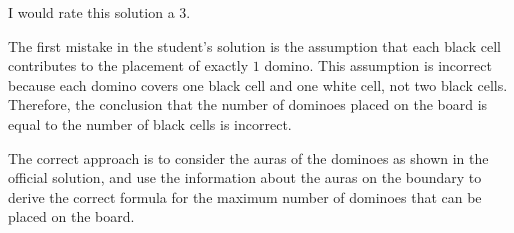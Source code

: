 I would rate this solution a 3.

The first mistake in the student's solution is the assumption that each black cell contributes to the placement of exactly $1$ domino. This assumption is incorrect because each domino covers one black cell and one white cell, not two black cells. Therefore, the conclusion that the number of dominoes placed on the board is equal to the number of black cells is incorrect.

The correct approach is to consider the auras of the dominoes as shown in the official solution, and use the information about the auras on the boundary to derive the correct formula for the maximum number of dominoes that can be placed on the board.
